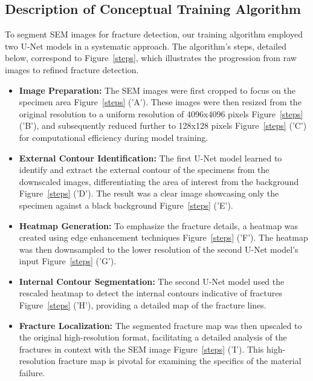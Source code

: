 \documentclass[preprint,12pt]{elsarticle}
\begin{document}
\subsection{Description of Conceptual Training Algorithm} \label{sec:alg_train}

To segment SEM images for fracture detection, our training algorithm employed two U-Net models in a systematic approach. The algorithm's steps, detailed below, correspond to Figure~\ref{steps}, which illustrates the progression from raw images to refined fracture detection.

\begin{itemize}
  \item \textbf{Image Preparation:}
  The SEM images were first cropped to focus on the specimen area Figure~\ref{steps} ('A'). These images were then resized from the original resolution to a uniform resolution of 4096x4096 pixels Figure~\ref{steps} ('B'), and subsequently reduced further to 128x128 pixels Figure~\ref{steps} ('C') for computational efficiency during model training.

  \item \textbf{External Contour Identification:}
  The first U-Net model learned to identify and extract the external contour of the specimens from the downscaled images, differentiating the area of interest from the background Figure~\ref{steps} ('D'). The result was a clear image showcasing only the specimen against a black background Figure~\ref{steps} ('E').

  \item \textbf{Heatmap Generation:}
  To emphasize the fracture details, a heatmap was created using edge enhancement techniques Figure~\ref{steps} ('F'). The heatmap was then downsampled to the lower resolution of the second U-Net model's input Figure~\ref{steps} ('G').

  \item \textbf{Internal Contour Segmentation:}
  The second U-Net model used the rescaled heatmap to detect the internal contours indicative of fractures Figure~\ref{steps} ('H'), providing a detailed map of the fracture lines.

  \item \textbf{Fracture Localization:}
  The segmented fracture map was then upscaled to the original high-resolution format, facilitating a detailed analysis of the fractures in context with the SEM image Figure~\ref{steps} ('I'). This high-resolution fracture map is pivotal for examining the specifics of the material failure.
\end{itemize}
\end{document}
